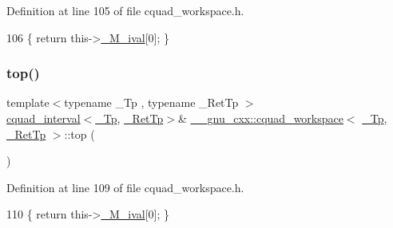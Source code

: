 Definition at line 105 of file cquad\+\_\+workspace.\+h.


\begin{DoxyCode}
106       \{ \textcolor{keywordflow}{return} this->\hyperlink{struct____gnu__cxx_1_1cquad__workspace_a46edeb05c52f2a406dc582b404fe83e6}{\_M\_ival}[0]; \}
\end{DoxyCode}
\mbox{\label{struct____gnu__cxx_1_1cquad__workspace_a6045595044796357d25adb9a12119b30}} 
\subsubsection{\texorpdfstring{top()}{top()}\hspace{0.1cm}{\footnotesize\ttfamily [2/2]}}
{\footnotesize\ttfamily template$<$typename \+\_\+\+Tp , typename \+\_\+\+Ret\+Tp $>$ \\
\hyperlink{struct____gnu__cxx_1_1cquad__interval}{cquad\+\_\+interval}$<$\hyperlink{namespace____gnu__cxx_a3b19a9c800ca194374ef9172290f7d79}{\+\_\+\+Tp}, \hyperlink{namespace____gnu__cxx_a886e03ece3d53ff7fa6c098a40f93fa5}{\+\_\+\+Ret\+Tp}$>$\& \hyperlink{struct____gnu__cxx_1_1cquad__workspace}{\+\_\+\+\_\+gnu\+\_\+cxx\+::cquad\+\_\+workspace}$<$ \hyperlink{namespace____gnu__cxx_a3b19a9c800ca194374ef9172290f7d79}{\+\_\+\+Tp}, \hyperlink{namespace____gnu__cxx_a886e03ece3d53ff7fa6c098a40f93fa5}{\+\_\+\+Ret\+Tp} $>$\+::top (\begin{DoxyParamCaption}{ }\end{DoxyParamCaption})\hspace{0.3cm}{\ttfamily [inline]}}



Definition at line 109 of file cquad\+\_\+workspace.\+h.


\begin{DoxyCode}
110       \{ \textcolor{keywordflow}{return} this->\hyperlink{struct____gnu__cxx_1_1cquad__workspace_a46edeb05c52f2a406dc582b404fe83e6}{\_M\_ival}[0]; \}
\end{DoxyCode}
\mbox{\label{struct____gnu__cxx_1_1cquad__workspace_a9eb68447dc880ef6de7cd695d7e223ae}} 
